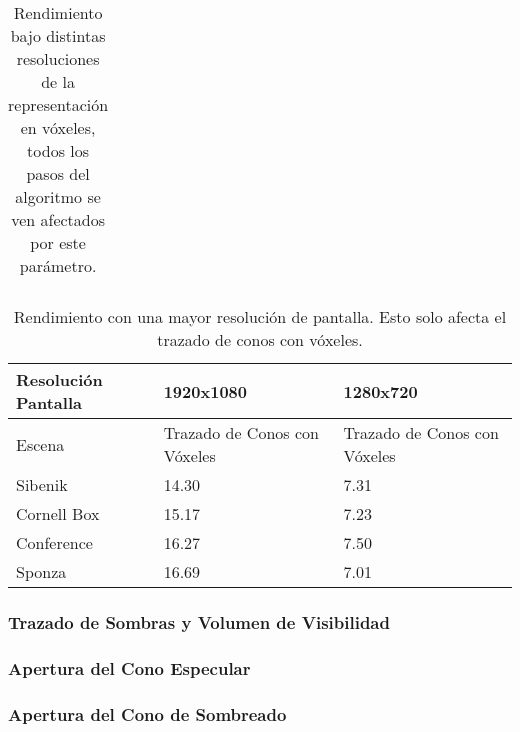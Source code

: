 \begin{table}[h]
\begin{tabular}{lllllllllll}
\end{tabular}
\captionsetup{justification=centering}
\caption{Rendimiento bajo distintas resoluciones de la representación en vóxeles, todos los pasos del algoritmo se ven afectados por este parámetro.}
\label{tab:performance_depth}
\end{table}

\begin{table}[h]
\centering
\begin{tabular}{|l|l|l|}
\hline
Resolución Pantalla  & 1920x1080                    & 1280x720                     \\ \hline
Escena      & Trazado de Conos con Vóxeles & Trazado de Conos con Vóxeles \\ \hline
Sibenik     & 14.30                        & 7.31                         \\
Cornell Box & 15.17                        & 7.23                         \\
Conference  & 16.27                        & 7.50                         \\
Sponza      & 16.69                        & 7.01                         \\ \hline
\end{tabular}
\captionsetup{justification=centering}
\caption{Rendimiento con una mayor resolución de pantalla. Esto solo afecta el trazado de conos con vóxeles.}
\label{tab:performance_display}
\end{table}



\subsubsection{Trazado de Sombras y Volumen de Visibilidad}

\subsubsection{Apertura del Cono Especular}

\subsubsection{Apertura del Cono de Sombreado}
